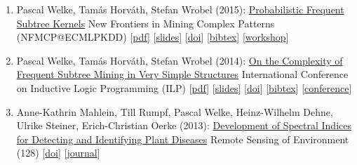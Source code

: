 \documentclass{scrartcl}
\begin{document}
\begin{enumerate}
{[\href{https://dx.doi.org/10.1145/2971648.2971707}{doi}]
[\href{https://dblp.org/rec/conf/huc/WelkeABM16.bib}{bibtex}]
[\href{http://ubicomp.org/ubicomp2016/}{conference}]
}
\item
\label{welke2015nfmcp}
Pascal Welke, Tamás Horváth, Stefan Wrobel (2015):\newline
\href{https://dx.doi.org/10.1007/978-3-319-39315-5_12}{Probabilistic Frequent Subtree Kernels}\newline
New Frontiers in Mining Complex Patterns (NFMCP@ECMLPKDD)\newline
{\footnotesize
[\href{https://pwelke.github.io/publications/welke2015nfmcp.pdf}{pdf}]
[\href{https://pwelke.github.io/publications/welke2015nfmcp-slides.pdf}{slides}]
[\href{https://dx.doi.org/10.1007/978-3-319-39315-5_12}{doi}]
[\href{https://dblp.org/rec/conf/pkdd/WelkeHW15.bib}{bibtex}]
[\href{http://www.di.uniba.it/~loglisci/nfMCP15/}{workshop}]
}
\item
\label{welke2014ilp}
Pascal Welke, Tamás Horváth, Stefan Wrobel (2014):\newline
\href{https://dx.doi.org/10.1007/978-3-319-23708-4_14}{On the Complexity of Frequent Subtree Mining in Very Simple Structures}\newline
International Conference on Inductive Logic Programming (ILP)\newline
{\footnotesize
[\href{https://pwelke.github.io/publications/welke2014ilp.pdf}{pdf}]
[\href{https://pwelke.github.io/publications/welke2014ilp-slides.pdf}{slides}]
[\href{https://dx.doi.org/10.1007/978-3-319-23708-4_14}{doi}]
[\href{https://dblp.org/rec/conf/ilp/WelkeHW14.bib}{bibtex}]
[\href{https://dtai.cs.kuleuven.be/events/ilp2014/}{conference}]
}
\item
\label{mahlein2013development}
Anne-Kathrin Mahlein, Till Rumpf, Pascal Welke, Heinz-Wilhelm Dehne, Ulrike Steiner, Erich-Christian Oerke (2013):\newline
\href{https://dx.doi.org/10.1016/j.rse.2012.09.019}{Development of Spectral Indices for Detecting and Identifying Plant Diseases}\newline
Remote Sensing of Environment (128)\newline
{\footnotesize
[\href{https://dx.doi.org/10.1016/j.rse.2012.09.019}{doi}]
[\href{https://www.journals.elsevier.com/remote-sensing-of-environment}{journal}]
}
\seti
\end{enumerate}
\end{document}
